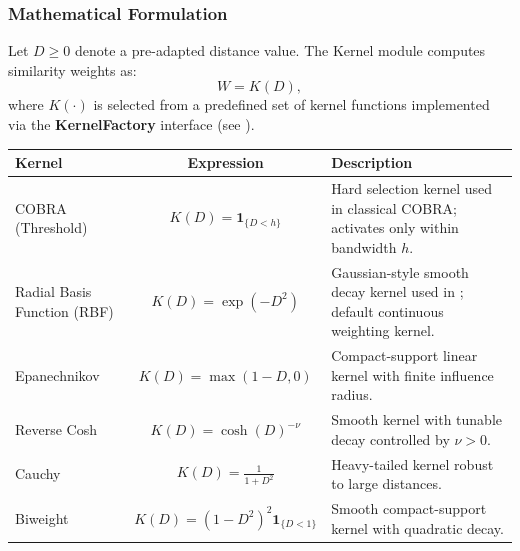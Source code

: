 \subsubsection*{Mathematical Formulation}

Let $D \ge 0$ denote a pre-adapted distance value. The Kernel module computes similarity weights as:
\[
    W = K(D),
\]
where $K(\cdot)$ is selected from a predefined set of kernel functions implemented via the \textbf{KernelFactory} interface (see ).

\begin{table}[H]
    \centering
    \renewcommand{\arraystretch}{1.4}
    \setlength{\extrarowheight}{2pt}
    \begin{tabularx}{\textwidth}{|l|c|X|}
        \hline
        \textbf{Kernel}                             & \textbf{Expression} & \textbf{Description}       \\
        \hline

        COBRA (Threshold)                           &
        $K(D) = \mathbf{1}_{\{D < h\}}$             &
        Hard selection kernel used in classical COBRA; activates only within bandwidth $h$.            \\
        \hline


        Radial Basis Function (RBF) &
        $K(D) = \exp(-D^2)$ &
        Gaussian-style smooth decay kernel used in \GradientCOBRA{}; default continuous weighting kernel. \\
        \hline


        Epanechnikov                                &
        $K(D) = \max(1 - D, 0)$                     &
        Compact-support linear kernel with finite influence radius.                                    \\
        \hline

        Reverse Cosh                                &
        $K(D) = \cosh(D)^{-\nu}$                    &
        Smooth kernel with tunable decay controlled by $\nu > 0$.                                      \\
        \hline

        Cauchy                                      &
        $K(D) = \frac{1}{1 + D^2}$                  &
        Heavy-tailed kernel robust to large distances.                                                 \\
        \hline

        Biweight                                    &
        $K(D) = (1 - D^2)^2 \mathbf{1}_{\{D < 1\}}$ &
        Smooth compact-support kernel with quadratic decay.                                            \\
        \hline


\end{tabularx}
\end{table}
